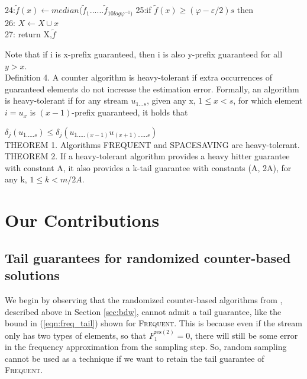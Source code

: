 \documentclass{article}
\begin{document}
\begin{multicols}{2}
{\begin{algorithm}[H]
    	24:\hspace*{.6cm}$\tilde{f}(x)\leftarrow median(\tilde{f}_{1}......\tilde{f}_{10log\varphi^{-1})}$
    	25:\hspace*{.3cm}if $\tilde{f}(x) \geqslant(\varphi-\varepsilon/2)s$ then\\
    	26:    \hspace*{.6cm}$X\leftarrow X \cup {x}$\\
    	27:    \hspace*{.3cm}return X,$\tilde{f}$\\
    \end{algorithm}
   	

    

	Note that if i is x-prefix guaranteed, then i is also y-prefix guaranteed for all $y > x$.\\
	
	Definition 4. A counter algorithm is heavy-tolerant if extra occurrences of guaranteed elements do not increase the estimation error. Formally, an algorithm is heavy-tolerant if for any stream $u_{1...s}$, given any x, $1 \leq x < s$, for which element $i =u_x$ is $(x-1)$-prefix guaranteed, it holds that
	
	$\delta_j(u_{1.....s}) \leq \delta_j(u_{1.....(x-1)}u_{(x+1)......s})$\\
	
	THEOREM 1. Algorithms FREQUENT and SPACESAVING are heavy-tolerant.\\
	
	THEOREM 2. If a heavy-tolerant algorithm provides a heavy hitter guarantee with constant A, it also provides a k-tail guarantee with constants (A, 2A), for any k, $1 \leq k < m/2A$.
		
}
	\section{Our Contributions}
\subsection{Tail guarantees for randomized counter-based solutions}

We begin by observing that the randomized counter-based algorithms from \cite{BDW16}, described above in Section \ref{sec:bdw}, cannot admit a tail guarantee, like the bound in (\ref{eqn:freq_tail}) shown for \textsc{Frequent}. This is because even if the stream only has two types of elements, so that $F_1^{\text{res}(2)} = 0$, there will still be some error in the frequency approximation from the sampling step. So, random sampling cannot be used as a technique if we want to retain the tail guarantee of \textsc{Frequent}.


\end{multicols}
\end{document}
